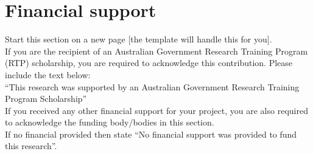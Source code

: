 



\clearpage
\section*{Financial support}

\begin{instructional}
    Start this section on a new page [the template will handle this for you].\\
    
    \noindent
    If you are the recipient of an Australian Government Research Training Program (RTP) scholarship, you are required to acknowledge this contribution.  Please include the text below:\\
    
    \noindent
    ``This research was supported by an Australian Government Research Training Program Scholarship''\\
    
    \noindent
    If you received any other financial support for your project, you are also required to acknowledge the funding body/bodies in this section.\\
    
    \noindent
    If no financial provided then state ``No financial support was provided to fund this research''.
\end{instructional}








